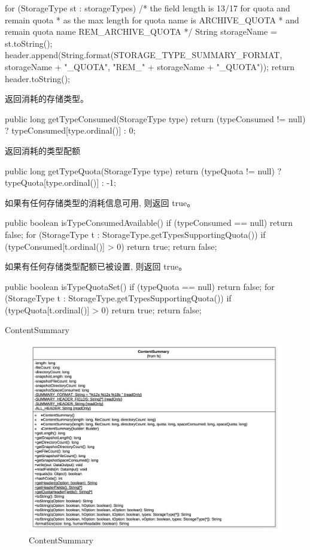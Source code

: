 \begin{java}
\begin{java}
{	  for (StorageType st : storageTypes) {
	    /* the field length is 13/17 for quota and remain quota
	     * as the max length for quota name is ARCHIVE_QUOTA
	      * and remain quota name REM_ARCHIVE_QUOTA */
	    String storageName = st.toString();
	    header.append(String.format(STORAGE_TYPE_SUMMARY_FORMAT,
	        storageName + "_QUOTA", "REM_" + storageName + "_QUOTA"));
	  }
	  return header.toString();
	}
\end{java}
返回消耗的存储类型。
\begin{java}
	public long getTypeConsumed(StorageType type) {
	  return (typeConsumed != null) ? typeConsumed[type.ordinal()] : 0;
	}
\end{java}
返回消耗的类型配额
\begin{java}
	public long getTypeQuota(StorageType type) {
	  return (typeQuota != null) ? typeQuota[type.ordinal()] : -1;
	}
\end{java}
如果有任何存储类型的消耗信息可用, 则返回 true。
\begin{java}
	public boolean isTypeConsumedAvailable() {
	  if (typeConsumed == null) {
	    return false;
	  }
	  for (StorageType t : StorageType.getTypesSupportingQuota()) {
	    if (typeConsumed[t.ordinal()] > 0) {
	      return true;
	    }
	  }
	  return false;
	}
\end{java}
如果有任何存储类型配额已被设置, 则返回 true。
\begin{java}
	public boolean isTypeQuotaSet() {
	  if (typeQuota == null) {
	    return false;
	  }
	  for (StorageType t : StorageType.getTypesSupportingQuota()) {
	    if (typeQuota[t.ordinal()] > 0) {
	      return true;
	    }
	  }
	  return false;
	}
\end{java}

ContentSummary

\begin{figure}[h]
\centering
\includegraphics[width =1\linewidth]{9.png}
\caption{ContentSummary}
\label{fig:ContentSummary}
\end{figure}


\end{java}
